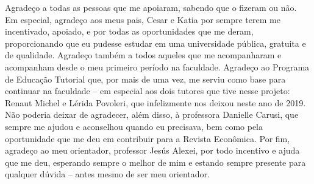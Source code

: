 \begin{agradecimentos}

\noindent
Agradeço a todas as pessoas que me apoiaram, sabendo que o fizeram ou não.\\

\noindent
Em especial, agradeço aos meus pais, Cesar e Katia por sempre terem me incentivado, apoiado, e por todas as oportunidades que me deram, proporcionando que eu pudesse estudar em uma universidade pública, gratuita e de qualidade. Agradeço também a todos aqueles que me acompanharam e acompanham desde o meu primeiro período na faculdade. Agradeço ao Programa de Educação Tutorial que, por mais de uma vez, me serviu como base para continuar na faculdade -- em especial aos dois tutores que tive nesse projeto: Renaut Michel e Lérida Povoleri, que infelizmente nos deixou neste ano de 2019. \\  

\noindent
Não poderia deixar de agradecer, além disso, à professora Danielle Carusi, que sempre me ajudou e aconselhou quando eu precisava, bem como pela oportunidade que me deu em contribuir para a Revista Econômica. Por fim, agradeço ao meu orientador, professor Jesús Alexei, por todo incentivo e ajuda que me deu, esperando sempre o melhor de mim e estando sempre presente para qualquer dúvida -- antes mesmo de ser meu orientador.

\end{agradecimentos}
